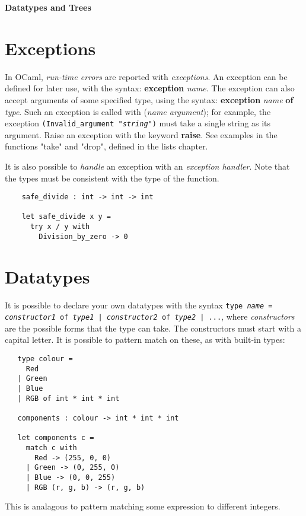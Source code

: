 \documentclass[12pt]{article}
\begin{document}
\begin{center}\LARGE\bf
    Datatypes and Trees
\end{center}

\section{Exceptions}
In OCaml, \textit{run-time errors} are reported with \textit{exceptions}. An exception can be defined
for later use, with the syntax: \textbf{exception} \textit{name}. The exception can also accept arguments
of some specified type, using the syntax: \textbf{exception} \textit{name} \textbf{of} \textit{type}.
Such an exception is called with (\textit{name argument}); for example, the exception \texttt{(Invalid\_argument "\textit{string}")}
must take a single string as its argument. Raise an exception with the keyword \textbf{raise}. See
examples in the functions "take" and "drop", defined in the lists chapter.

It is also possible to \textit{handle} an exception with an \textit{exception handler}. Note that the types must be
consistent with the type of the function.
\begin{lstlisting}
    safe_divide : int -> int -> int

    let safe_divide x y =
      try x / y with
        Division_by_zero -> 0
\end{lstlisting}

\section{Datatypes}
It is possible to declare your own datatypes with the syntax \texttt{type \textit{name} = \textit{constructor1}
 of \textit{type1} | \textit{constructor2} of \textit{type2} | ...}, where \textit{constructors} are the possible
 forms that the type can take. The constructors must start with a capital letter. It is possible to pattern match on these, as with built-in types:
 \begin{lstlisting}
   type colour =
     Red
   | Green
   | Blue
   | RGB of int * int * int

   components : colour -> int * int * int

   let components c =
     match c with
       Red -> (255, 0, 0)
     | Green -> (0, 255, 0)
     | Blue -> (0, 0, 255)
     | RGB (r, g, b) -> (r, g, b)
 \end{lstlisting}
 This is analagous to pattern matching some expression to different integers.
\end{document}
